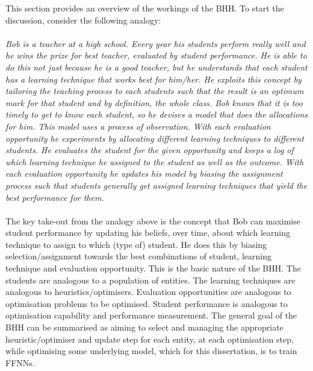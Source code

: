 This section provides an overview of the workings of the \Ac{BHH}. To start the discussion, consider the following analogy:\\
\\
\textit{
      Bob is a teacher at a high school. Every year his students perform really well and he wins the prize for best teacher, evaluated by student performance. He is able to do this not just because he is a good teacher, but he understands that each student has a learning technique that works best for him/her. He exploits this concept by tailoring the teaching process to each students such that the result is an optimum mark for that student and by definition, the whole class. Bob knows that it is too timely to get to know each student, so he devises a model that does the allocations for him. This model uses a process of observation. With each evaluation opportunity he experiments by allocating different learning techniques to different students. He evaluates the student for the given opportunity and keeps a log of which learning technique he assigned to the student as well as the outcome. With each evaluation opportunity he updates his model by biasing the assignment process such that students generally get assigned learning techniques that yield the best performance for them.
}\\
\\
The key take-out from the analogy above is the concept that Bob can maximise student performance by updating his beliefs, over time, about which learning technique to assign to which (type of) student. He does this by biasing selection/assignment towards the best combinations of student, learning technique
and evaluation opportunity. This is the basic nature of the \Ac{BHH}. The students are analogous to a population of entities. The learning techniques are analogous to heuristics/optimisers. Evaluation opportunities are analogous to optimisation problems to be optimised. Student performance is analogous to optimisation capability and performance measurement. The general goal of the \ac{BHH} can be summarised as aiming to select and managing the appropriate  heuristic/optimiser and update step for each entity, at each optimisation step, while optimising some underlying model, which for this dissertation, is to train \acp{FFNN}.

